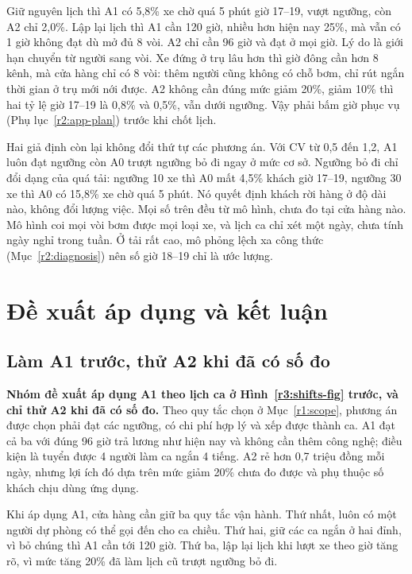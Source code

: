 Giữ nguyên lịch thì A1 có 5,8\% xe chờ quá 5 phút giờ 17--19, vượt ngưỡng, còn A2 chỉ 2,0\%. Lập lại lịch thì A1 cần 120 giờ, nhiều hơn hiện nay 25\%, mà vẫn có 1 giờ không đạt dù mở đủ 8 vòi. A2 chỉ cần 96 giờ và đạt ở mọi giờ.
Lý do là giới hạn chuyển từ người sang vòi. Xe đứng ở trụ lâu hơn thì giờ đông cần hơn 8 kênh, mà cửa hàng chỉ có 8 vòi: thêm người cũng không có chỗ bơm, chỉ rút ngắn thời gian ở trụ mới nới được. A2 không cần đúng mức giảm 20\%, giảm 10\% thì hai tỷ lệ giờ 17--19 là 0,8\% và 0,5\%, vẫn dưới ngưỡng. Vậy phải bấm giờ phục vụ (Phụ lục~\ref{r2:app-plan}) trước khi chốt lịch.


Hai giả định còn lại không đổi thứ tự các phương án. Với CV từ 0,5 đến 1,2, A1 luôn đạt ngưỡng còn A0 trượt ngưỡng bỏ đi ngay ở mức cơ sở. Ngưỡng bỏ đi chỉ đổi dạng của quá tải: ngưỡng 10 xe thì A0 mất 4,5\% khách giờ 17--19, ngưỡng 30 xe thì A0 có 15,8\% xe chờ quá 5 phút. Nó quyết định khách rời hàng ở độ dài nào, không đổi lượng việc.
% 
Mọi số trên đều từ mô hình, chưa đo tại cửa hàng nào. Mô hình coi mọi vòi bơm được mọi loại xe, và lịch ca chỉ xét một ngày, chưa tính ngày nghỉ trong tuần. Ở tải rất cao, mô phỏng lệch xa công thức (Mục~\ref{r2:diagnosis}) nên số giờ 18--19 chỉ là ước lượng.

\section{Đề xuất áp dụng và kết luận}
\label{r3:conclusion}
\subsection{Làm A1 trước, thử A2 khi đã có số đo}
\noindent
\textbf{Nhóm đề xuất áp dụng A1 theo lịch ca ở Hình~\ref{r3:shifts-fig} trước, và chỉ thử A2 khi đã có số đo.} Theo quy tắc chọn ở Mục~\ref{r1:scope}, phương án được chọn phải đạt các ngưỡng, có chi phí hợp lý và xếp được thành ca. A1 đạt cả ba với đúng 96 giờ trả lương như hiện nay và không cần thêm công nghệ; điều kiện là tuyển được 4 người làm ca ngắn 4 tiếng. A2 rẻ hơn 0,7 triệu đồng mỗi ngày, nhưng lợi ích đó dựa trên mức giảm 20\% chưa đo được và phụ thuộc số khách chịu dùng ứng dụng.

Khi áp dụng A1, cửa hàng cần giữ ba quy tắc vận hành. Thứ nhất, luôn có một người dự phòng có thể gọi đến cho ca chiều. Thứ hai, giữ các ca ngắn ở hai đỉnh, vì bỏ chúng thì A1 cần tới 120 giờ. Thứ ba, lập lại lịch khi lượt xe theo giờ tăng rõ, vì mức tăng 20\% đã làm lịch cũ trượt ngưỡng bỏ đi.


